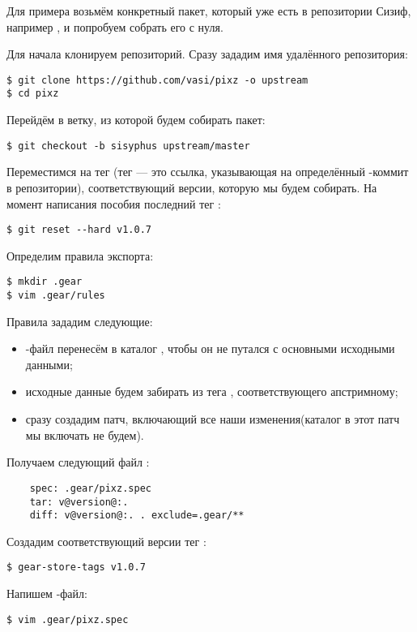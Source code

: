 
Для примера возьмём конкретный пакет, который уже есть в репозитории Сизиф, например , и попробуем
собрать его с нуля.

Для начала клонируем репозиторий. Сразу зададим имя удалённого репозитория:
\begin{verbatim}
$ git clone https://github.com/vasi/pixz -o upstream
$ cd pixz
\end{verbatim}

Перейдём в ветку, из которой будем собирать пакет:
\begin{verbatim}
$ git checkout -b sisyphus upstream/master
\end{verbatim}

Переместимся на тег (тег --- это ссылка, указывающая на определённый -коммит в репозитории),
соответствующий версии, которую мы будем собирать. На момент написания пособия последний тег :
\begin{verbatim}
$ git reset --hard v1.0.7
\end{verbatim}

Определим правила экспорта:
\begin{verbatim}
$ mkdir .gear
$ vim .gear/rules
\end{verbatim}

Правила зададим следующие:
\begin{itemize}
	\item {}-файл перенесём в каталог , чтобы он не путался с основными исходными данными;
	\item исходные данные будем забирать из тега , соответствующего апстримному;
	\item сразу создадим патч, включающий все наши изменения(каталог  в этот патч мы включать не будем).
\end{itemize}

Получаем следующий файл :
\begin{verbatim}
    spec: .gear/pixz.spec
    tar: v@version@:.
    diff: v@version@:. . exclude=.gear/**
\end{verbatim}

Создадим соответствующий версии тег :
\begin{verbatim}
$ gear-store-tags v1.0.7
\end{verbatim}

Напишем -файл:
\begin{verbatim}
$ vim .gear/pixz.spec
\end{verbatim}

